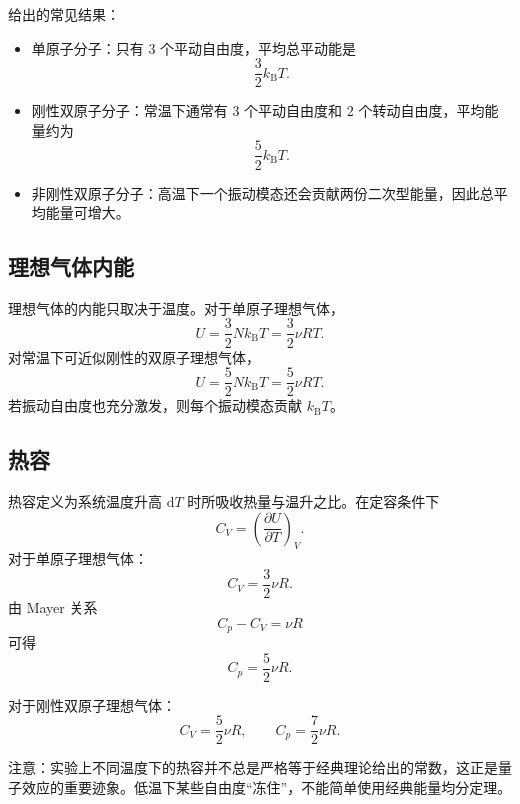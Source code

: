 \documentclass[11pt,a4paper,openany]{ctexbook}
\newcommand{\dd}{\mathrm d}
\newcommand{\kb}{k_{\mathrm B}}
\newcommand{\pp}[2]{\frac{\partial #1}{\partial #2}}
\begin{document}
给出的常见结果：
\begin{itemize}[leftmargin=2.2em]
\item 单原子分子：只有 3 个平动自由度，平均总平动能是
\[
\frac32\kb T.
\]
\item 刚性双原子分子：常温下通常有 3 个平动自由度和 2 个转动自由度，平均能量约为
\[
\frac52\kb T.
\]
\item 非刚性双原子分子：高温下一个振动模态还会贡献两份二次型能量，因此总平均能量可增大。
\end{itemize}

\subsection*{理想气体内能}
理想气体的内能只取决于温度。对于单原子理想气体，
\[
U=\frac32N\kb T=\frac32\nu RT.
\]
对常温下可近似刚性的双原子理想气体，
\[
U=\frac52N\kb T=\frac52\nu RT.
\]
若振动自由度也充分激发，则每个振动模态贡献 $k_{\mathrm B}T$。

\subsection*{热容}
热容定义为系统温度升高 $\dd T$ 时所吸收热量与温升之比。在定容条件下
\[
C_V=\left(\pp U T\right)_V.
\]
对于单原子理想气体：
\[
\boxed{C_V=\frac32\nu R}.
\]
由 Mayer 关系
\[
C_p-C_V=\nu R
\]
可得
\[
\boxed{C_p=\frac52\nu R}.
\]

对于刚性双原子理想气体：
\[
\boxed{C_V=\frac52\nu R,\qquad C_p=\frac72\nu R}.
\]

\begin{center}
\end{center}

\begin{notebox}
注意：实验上不同温度下的热容并不总是严格等于经典理论给出的常数，这正是量子效应的重要迹象。低温下某些自由度“冻住”，不能简单使用经典能量均分定理。
\end{notebox}
\end{document}
